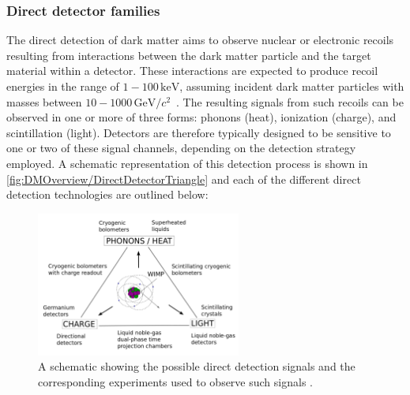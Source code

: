 \subsubsection{Direct detector families}
The direct detection of dark matter aims to observe nuclear or electronic recoils resulting from interactions between the dark matter particle and the target material within a detector. These interactions are expected to produce recoil energies in the range of $1-100\,\mathrm{keV}$, assuming incident dark matter particles with masses between $10-1000\,\mathrm{GeV}/c^2$~\cite{DirectDetection2015}. The resulting signals from such recoils can be observed in one or more of three forms: phonons (heat), ionization (charge), and scintillation (light). Detectors are therefore typically designed to be sensitive to one or two of these signal channels, depending on the detection strategy employed. A schematic representation of this detection process is shown in \autoref{fig:DMOverview/DirectDetectorTriangle} and each of the different direct detection technologies are outlined below:
\begin{figure}[ht!]
	\centering
	\includegraphics[width=0.6\textwidth]{figures/DMOverview/Direct_direction.png}
	\caption[A schematic showing the possible direct detection signals with corresponding experiments.]{A schematic showing the possible direct detection signals and the corresponding experiments used to observe such signals \cite{DirectDetection2015}.}
	\label{fig:DMOverview/DirectDetectorTriangle}
\end{figure}
